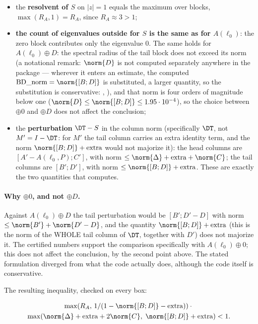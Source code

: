 \begin{itemize}
\item the \textbf{resolvent of $S$} on $|z| = 1$ equals the maximum over
  blocks, $\max(R_{A}, 1) = R_{A}$, since $R_{A} \approx 3 > 1$;
\item \textbf{the count of eigenvalues outside for $S$ is the same as for
  $A(\ell_{0})$}: the zero block contributes only the eigenvalue $0$.
  The same holds for $A(\ell_{0}) \oplus D$: the spectral radius of the
  tail block does not exceed its norm (a notational remark: $\norm{D}$ is
  not computed separately anywhere in the package --- wherever it enters
  an estimate, the computed $\mathrm{BD\_norm} = \norm{[B;D]}$ is
  substituted, a larger quantity, so the substitution is conservative:
  , ), and that
  norm is four orders of magnitude below one
  ($\norm{D} \le \norm{[B;D]} \le 1.95\cdot 10^{-4}$), so the choice between
  $\oplus 0$ and $\oplus D$ does not affect the conclusion;
\item the \textbf{perturbation} $\DT - S$ in the column norm (specifically
  $\DT$, not $M' = I - \DT$: for $M'$ the tail column carries an extra
  identity term, and the norm $\norm{[B;D]} + \mathrm{extra}$ would not
  majorize it): the head columns are $[A' - A(\ell_{0},P); C']$, with
  norm $\le \norm{\Delta} + \mathrm{extra} + \norm{C}$; the tail columns
  are $[B'; D']$, with norm $\le \norm{[B;D]} + \mathrm{extra}$. These
  are exactly the two quantities that  computes.
\end{itemize}

\paragraph{Why $\oplus 0$, and not $\oplus D$.} Against
$A(\ell_{0}) \oplus D$ the tail perturbation would be
$[B'; D' - D]$ with norm $\le \norm{B'} + \norm{D' - D}$, and the quantity
$\norm{[B;D]} + \mathrm{extra}$ (this is the norm of the WHOLE tail column
of $\DT$, together with $D'$) does not majorize it. The certified numbers
support the comparison specifically with $A(\ell_{0}) \oplus 0$; this does
not affect the conclusion, by the second point above. The stated
formulation diverged from what the code actually does, although the code
itself is conservative.

The resulting inequality, checked on every box:

\begin{multline*}
\max(R_{A},\, 1/(1-\norm{[B;D]}-\mathrm{extra}))\cdot{}\\
\max(\norm{\Delta} + \mathrm{extra} + 2\norm{C},\; \norm{[B;D]} + \mathrm{extra}) < 1 .
\end{multline*}

